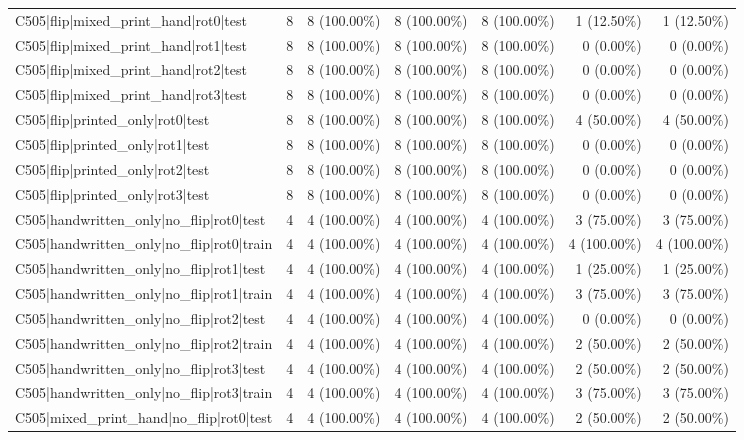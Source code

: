 \begin{longtable}{>{\raggedright\arraybackslash}p{5cm}rrrrrr}
C505|flip|mixed\_print\_hand|rot0|test & 8 & 8 (100.00\%) & 8 (100.00\%) & 8 (100.00\%) & 1 (12.50\%) & 1 (12.50\%) \\
C505|flip|mixed\_print\_hand|rot1|test & 8 & 8 (100.00\%) & 8 (100.00\%) & 8 (100.00\%) & 0 (0.00\%) & 0 (0.00\%) \\
C505|flip|mixed\_print\_hand|rot2|test & 8 & 8 (100.00\%) & 8 (100.00\%) & 8 (100.00\%) & 0 (0.00\%) & 0 (0.00\%) \\
C505|flip|mixed\_print\_hand|rot3|test & 8 & 8 (100.00\%) & 8 (100.00\%) & 8 (100.00\%) & 0 (0.00\%) & 0 (0.00\%) \\
C505|flip|printed\_only|rot0|test & 8 & 8 (100.00\%) & 8 (100.00\%) & 8 (100.00\%) & 4 (50.00\%) & 4 (50.00\%) \\
C505|flip|printed\_only|rot1|test & 8 & 8 (100.00\%) & 8 (100.00\%) & 8 (100.00\%) & 0 (0.00\%) & 0 (0.00\%) \\
C505|flip|printed\_only|rot2|test & 8 & 8 (100.00\%) & 8 (100.00\%) & 8 (100.00\%) & 0 (0.00\%) & 0 (0.00\%) \\
C505|flip|printed\_only|rot3|test & 8 & 8 (100.00\%) & 8 (100.00\%) & 8 (100.00\%) & 0 (0.00\%) & 0 (0.00\%) \\
C505|handwritten\_only|no\_flip|rot0|test & 4 & 4 (100.00\%) & 4 (100.00\%) & 4 (100.00\%) & 3 (75.00\%) & 3 (75.00\%) \\
C505|handwritten\_only|no\_flip|rot0|train & 4 & 4 (100.00\%) & 4 (100.00\%) & 4 (100.00\%) & 4 (100.00\%) & 4 (100.00\%) \\
C505|handwritten\_only|no\_flip|rot1|test & 4 & 4 (100.00\%) & 4 (100.00\%) & 4 (100.00\%) & 1 (25.00\%) & 1 (25.00\%) \\
C505|handwritten\_only|no\_flip|rot1|train & 4 & 4 (100.00\%) & 4 (100.00\%) & 4 (100.00\%) & 3 (75.00\%) & 3 (75.00\%) \\
C505|handwritten\_only|no\_flip|rot2|test & 4 & 4 (100.00\%) & 4 (100.00\%) & 4 (100.00\%) & 0 (0.00\%) & 0 (0.00\%) \\
C505|handwritten\_only|no\_flip|rot2|train & 4 & 4 (100.00\%) & 4 (100.00\%) & 4 (100.00\%) & 2 (50.00\%) & 2 (50.00\%) \\
C505|handwritten\_only|no\_flip|rot3|test & 4 & 4 (100.00\%) & 4 (100.00\%) & 4 (100.00\%) & 2 (50.00\%) & 2 (50.00\%) \\
C505|handwritten\_only|no\_flip|rot3|train & 4 & 4 (100.00\%) & 4 (100.00\%) & 4 (100.00\%) & 3 (75.00\%) & 3 (75.00\%) \\
C505|mixed\_print\_hand|no\_flip|rot0|test & 4 & 4 (100.00\%) & 4 (100.00\%) & 4 (100.00\%) & 2 (50.00\%) & 2 (50.00\%) \\

\end{longtable}
